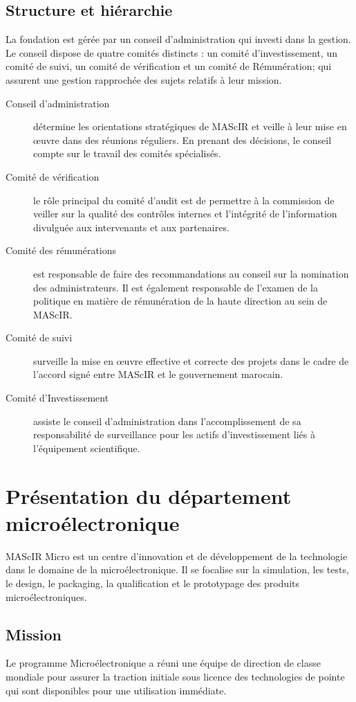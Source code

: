 \documentclass[11pt, a4paper, twoside]{book}
\begin{document}
\subsection{Structure et hiérarchie}
La fondation est gérée par un conseil d’administration qui  investi dans la gestion. Le conseil dispose de quatre comités distincts : un comité d’investissement, un comité de suivi, un comité de vérification et un comité de Rémunération; qui assurent une gestion rapprochée des sujets relatifs à leur mission.
\begin{description}
\item[Conseil d'administration] détermine les orientations stratégiques de MAScIR et veille à leur mise en œuvre dans des réunions réguliers. En prenant des décisions, le conseil compte sur le travail des comités spécialisés.
\item[Comité de vérification] le rôle principal du comité d'audit est de permettre à la commission de veiller sur la qualité des contrôles internes et l'intégrité de l'information divulguée aux intervenants et aux partenaires.
\item[Comité des rémunérations] est responsable de faire des recommandations au conseil sur la nomination des administrateurs. Il est également responsable de l'examen de la politique en matière de rémunération de la haute direction au sein de MAScIR.
\item[Comité de suivi] surveille la mise en œuvre effective et correcte des projets dans le cadre de l'accord signé entre MAScIR et le gouvernement marocain.
\item[Comité d'Investissement] assiste le conseil d'administration dans l'accomplissement de sa responsabilité de surveillance pour les actifs d'investissement liés à l'équipement scientifique.
\end{description}

\section{Présentation du département microélectronique}
MAScIR Micro est un centre d’innovation et de développement de la technologie dans le domaine de la microélectronique. Il se focalise sur la simulation, les tests, le design, le packaging, la qualification et le prototypage des produits microélectroniques.
\subsection{Mission}
Le programme Microélectronique a réuni une équipe de direction de classe mondiale pour assurer la traction initiale sous licence des technologies de pointe qui sont disponibles pour une utilisation immédiate. \\
\end{document}
